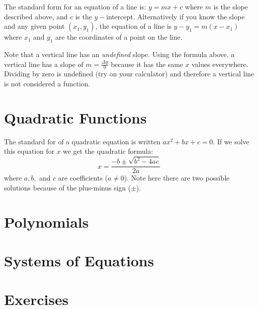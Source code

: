  
 The standard form for an equation of a line is: $y =m x +c$ where $m$ is the slope described above, and $c$ is the $y-$intercept. Alternatively if you know the slope and any given point $(x_1,y_1)$, the equation of a line is $y -y_{1} =m (x -x_{1})$ where $x_1$ and $y_1$ are the coordinates of a point on the line.

Note that a vertical line has an \textit{undefined} slope. Using the formula above, a vertical line has a slope of $m=\frac{\Delta y}{0}$ because it has the same $x$ values everywhere. Dividing by zero is undefined (try on your calculator) and therefore a vertical line is not considered a function.
\section{Quadratic Functions}
 The standard for of a quadratic equation is written $a x^{2} +b x +c =0$. If we solve this equation for $x$ we get the quadratic formula:
 $$x =\frac{ -b \pm \sqrt{b^{2} -4 a c}}{2 a}$$ 
 where $a,b,$ and $c$ are coefficients ($a\ne0$). Note here there are two possible solutions because of the plus-minus sign ($\pm$).
 
\section{Polynomials}
 


\section{Systems of Equations}
 
 
\section{Exercises} 
 
